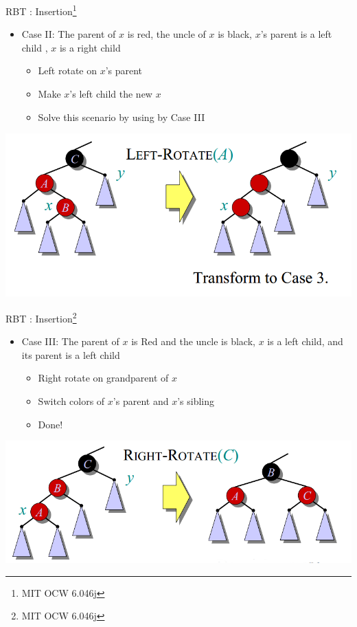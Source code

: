 \documentclass{beamer}
\begin{document}
\begin{frame}{RBT : Insertion\footnote{MIT OCW 6.046j}}
    \begin{itemize}
        \item Case II: The parent of $x$ is red, the uncle of $x$ is black, $x$'s parent is a left child , $x$ is a right child
        \begin{itemize}
            \item Left rotate on $x$'s parent
            \item Make $x$'s left child the new $x$
            \item Solve this scenario by using by Case III
        \end{itemize}
    \end{itemize}
    \begin{center}
        \includegraphics[scale=0.4]{rbtInsertEg2.png}
    \end{center}
\end{frame}


\begin{frame}{RBT : Insertion\footnote{MIT OCW 6.046j}}
    \begin{itemize}
        \item Case III: The parent of $x$ is Red and the uncle is black, $x$ is a left child, and its parent is a left child
        \begin{itemize}
            \item Right rotate on grandparent of $x$
            \item Switch colors of $x$'s parent and $x$'s sibling
            \item Done!
        \end{itemize}
    \end{itemize}
    \begin{center}
        \includegraphics[scale=0.38]{rbtInsertEg3.png}
    \end{center}
\end{frame}
\end{document}
